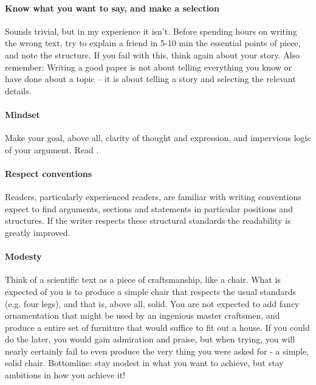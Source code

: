 \documentclass{tufte-book}
\begin{document}
\paragraph{Know what you want to say, and make a selection} Sounds trivial, but in my experience it isn't. Before spending hours on writing the wrong text, try to explain a friend in 5-10 min the essential points of piece, and note the structure. If you fail with this, think again about your story. Also remember: Writing a good paper is not about telling everything you know or have done about a topic -- it is about telling a story and selecting the relevant details. 

\paragraph{Mindset} Make your goal, above all, clarity of thought and expression, and impervious logic of your argument. Read \citet{Woodford1967}.

\paragraph{Respect conventions} Readers, particularly experienced readers, are familiar with writing conventions expect to find arguments, sections and statements in particular positions and structures. If the writer respects these structural standards the readability is greatly improved. 


\paragraph{Modesty} Think of a scientific text as a piece of craftsmanship, like a chair. What is expected of you is to produce a simple chair that respects the usual standards (e.g. four legs), and that is, above all, solid. You are not expected to add fancy ornamentation that might be used by an ingenious master craftsmen, and produce a entire set of furniture that would suffice to fit out a house. If you could do the later, you would gain admiration and praise, but when trying, you will nearly certainly fail to even produce the very thing you were asked for - a simple, solid chair. Bottomline: stay modest in what you want to achieve, but stay ambitions in how you achieve it!
\end{document}
